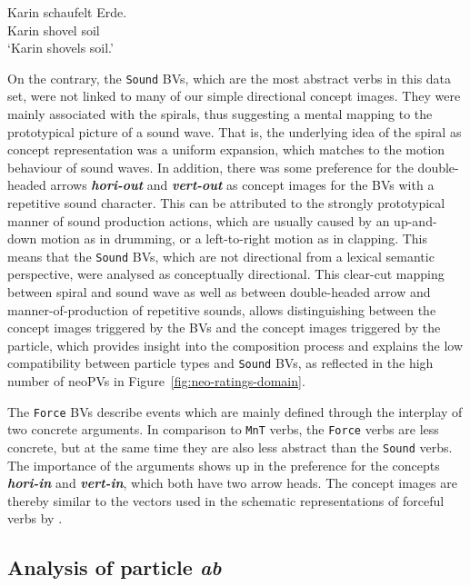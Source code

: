 \documentclass[output=paper]{langsci/langscibook}
\newcommand{\textci}[1]{\textit{\textbf{#1}}}
\begin{document}
\ea\label{ex:schaufelErde} 
\gll Karin schaufelt Erde.\\ 
Karin shovel soil\\
\glt `Karin shovels soil.'
\z

On the contrary, the \texttt{Sound} BVs, which are the most abstract
verbs in this data set, were not linked to many of our simple
directional concept images. They were mainly associated with the spirals, thus
suggesting a mental mapping to the prototypical picture of a sound
wave. That is, the underlying idea of the spiral as concept
representation was a uniform expansion, which matches to the motion
behaviour of sound waves. In addition, there was some preference for
the double-headed arrows \textci{hori-out} and \textci{vert-out} as
concept images for the BVs with a repetitive sound character. This can be
attributed to the strongly prototypical manner of sound production
actions, which are usually caused by an up-and-down motion as in
drumming, or a left-to-right motion as in clapping. This means that
the \texttt{Sound} BVs, which are not directional from a lexical
semantic perspective, were analysed as conceptually directional. This
clear-cut mapping between spiral and sound wave as well as between
double-headed arrow and manner-of-production of repetitive sounds,
allows distinguishing between the concept images triggered by the BVs and the concept images
triggered by the particle, which provides insight into the composition
process and explains the low compatibility between particle types and
\texttt{Sound} BVs, as reflected in the high number of neoPVs in
Figure~\ref{fig:neo-ratings-domain}.

The \texttt{Force} BVs describe events which are mainly defined
through the interplay of two concrete arguments. In comparison to
\texttt{MnT} verbs, the \texttt{Force} verbs are less concrete, but at
the same time they are also less abstract than the \texttt{Sound}
verbs. The importance of the arguments shows up in the preference for
the concepts \textci{hori-in} and \textci{vert-in}, which both have
two arrow heads. The concept images are thereby similar to the vectors used in
the schematic representations of forceful verbs by \cite{Zwarts:10}.

\subsection{Analysis of particle \textit{ab}}
\label{sec:disc-ab}
\end{document}
